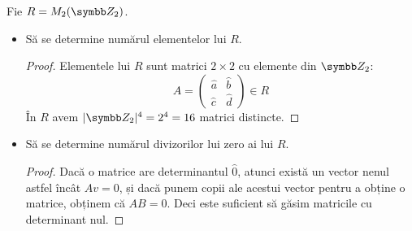 \begin{exercise}[1.29]
Fie \(R = M_2(\integersmod{2})\).
\begin{itemize}
    \item Să se determine numărul elementelor lui \(R\).
    \begin{proof}
    Elementele lui \(R\) sunt matrici \(2 \times 2\) cu elemente din \(\integersmod{2}\):
    \[
        A = \begin{pmatrix}
            \widehat{a} & \widehat{b} \\
            \widehat{c} & \widehat{d}
        \end{pmatrix} \in R
    \]
    În \(R\) avem \(\abs{\integersmod{2}}^4 = 2^4 = 16\) matrici distincte.
    \end{proof}
    
    \item Să se determine numărul divizorilor lui zero ai lui \(R\).
    \begin{proof}
    Dacă o matrice are determinantul \(\widehat{0}\), atunci există un vector nenul astfel încât \(A v = 0\), și dacă punem copii ale acestui vector pentru a obține o matrice, obținem că \(A B = 0\). Deci este suficient să găsim matricile cu determinant nul.
    

\end{proof}
\end{itemize}
\end{exercise}
